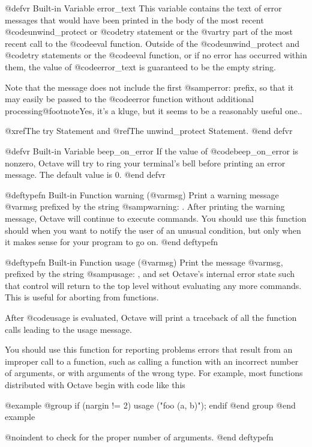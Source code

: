 @defvr {Built-in Variable} error_text
This variable contains the text of error messages that would have
been printed in the body of the most recent @code{unwind_protect} or
@code{try} statement or the @var{try} part of the most recent call to
the @code{eval} function.  Outside of the @code{unwind_protect} and
@code{try} statements or the @code{eval} function, or if no error has
occurred within them, the value of @code{error_text} is guaranteed to be
the empty string.

Note that the message does not include the first @samp{error: } prefix,
so that it may easily be passed to the @code{error} function without
additional processing@footnote{Yes, it's a kluge, but it seems to be a
reasonably useful one.}.

@xref{The try Statement} and @ref{The unwind_protect Statement}.
@end defvr

@defvr {Built-in Variable} beep_on_error
If the value of @code{beep_on_error} is nonzero, Octave will try
to ring your terminal's bell before printing an error message.  The
default value is 0.
@end defvr

@deftypefn {Built-in Function} {} warning (@var{msg})
Print a warning message @var{msg} prefixed by the string @samp{warning: }.  
After printing the warning message, Octave will continue to execute
commands.  You should use this function should when you want to notify
the user of an unusual condition, but only when it makes sense for your
program to go on.
@end deftypefn

@deftypefn {Built-in Function} {} usage (@var{msg})
Print the message @var{msg}, prefixed by the string @samp{usage: }, and
set Octave's internal error state such that control will return to the
top level without evaluating any more commands.  This is useful for
aborting from functions.

After @code{usage} is evaluated, Octave will print a traceback of all
the function calls leading to the usage message.

You should use this function for reporting problems errors that result
from an improper call to a function, such as calling a function with an
incorrect number of arguments, or with arguments of the wrong type.  For
example, most functions distributed with Octave begin with code like
this

@example
@group
if (nargin != 2)
  usage ("foo (a, b)");
endif
@end group
@end example

@noindent
to check for the proper number of arguments.
@end deftypefn

